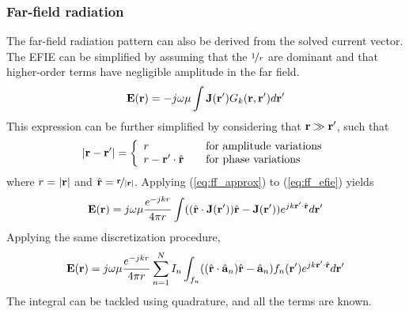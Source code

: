 \subsubsection{Far-field radiation}
The far-field radiation pattern can also be derived from the solved current vector. The EFIE can be simplified by assuming that the $\nicefrac{1}{r}$ are dominant and that higher-order terms have negligible amplitude in the far field.
\begin{equation}
	\mathbf{E}(\mathbf{r}) = -j\omega\mu \int \mathbf{J}(\mathbf{r}^\prime) G_k(\mathbf{r}, \mathbf{r}^\prime) d\mathbf{r}^\prime
	\label{eq:ff_efie}
\end{equation}
This expression can be further simplified by considering that $\mathbf{r} \gg \mathbf{r}^\prime$, such that
\begin{equation}
	|\mathbf{r} - \mathbf{r}^\prime| = \left\{ \begin{array}{ll}
		r \quad & \text{for amplitude variations} \\
		r - \mathbf{r}^\prime \cdot \hat{\mathbf{r}} \quad & \text{for phase variations}
	\end{array} \right.
	\label{eq:ff_approx}
\end{equation}
where $r = |\mathbf{r}|$ and $\hat{\mathbf{r}} = \nicefrac{\mathbf{r}}{|\mathbf{r}|}$. Applying (\ref{eq:ff_approx}) to (\ref{eq:ff_efie}) yields
\begin{equation}
	\mathbf{E}(\mathbf{r}) = j\omega\mu \frac{e^{-j k r}}{4\pi r} \int ((\hat{\mathbf{r}} \cdot \mathbf{J}(\mathbf{r}^\prime)) \hat{\mathbf{r}} - \mathbf{J}(\mathbf{r}^\prime)) e^{j k \mathbf{r}^\prime \cdot \hat{\mathbf{r}}} d\mathbf{r}^\prime
\end{equation}
Applying the same discretization procedure,
\begin{equation}
	\mathbf{E}(\mathbf{r}) = j\omega\mu \frac{e^{-j k r}}{4\pi r} \sum_{n = 1}^{N} I_n \int_{f_n} ((\hat{\mathbf{r}} \cdot \hat{\mathbf{a}}_n) \hat{\mathbf{r}} - \hat{\mathbf{a}}_n) f_n(\mathbf{r}^\prime) e^{j k \mathbf{r}^\prime \cdot \hat{\mathbf{r}}} d\mathbf{r}^\prime
\end{equation}
The integral can be tackled using quadrature, and all the terms are known.